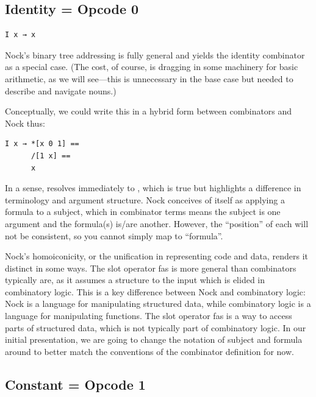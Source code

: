 \subsection{ Identity = Opcode 0}

\begin{lstlisting}[style=listingcomb,frame=tb]
I x → x
\end{lstlisting}

Nock's binary tree addressing is fully general and yields the identity combinator  as a special case.  (The cost, of course, is dragging in some machinery for basic arithmetic, as we will see---this is unnecessary in the base case but needed to describe and navigate nouns.)

Conceptually, we could write this in a hybrid form between combinators and Nock thus:

\begin{lstlisting}[style=listingcomb,frame=tb]
I x → *[x 0 1] ==
      /[1 x] ==
      x
\end{lstlisting}

\noindent
In a sense,  resolves immediately to \textct{[0 1]}, which is true but highlights a difference in terminology and argument structure.  Nock conceives of itself as applying a formula to a subject, which in combinator terms means the subject is one argument and the formula(s) is/are another.  However, the ``position'' of each will not be consistent, so you cannot simply map  to ``formula''.

Nock's homoiconicity, or the unification in representing code and data, renders it distinct in some ways.  The slot operator \textct{/} fas is more general than combinators typically are, as it assumes a structure to the input which is elided in combinatory logic.  This is a key difference between Nock and combinatory logic:  Nock is a language for manipulating structured data, while combinatory logic is a language for manipulating functions.  The slot operator \textct{/} fas is a way to access parts of structured data, which is not typically part of combinatory logic.  In our initial presentation, we are going to change the notation of subject and formula around to better match the conventions of the combinator definition for now.

\subsection{ Constant = Opcode 1}

